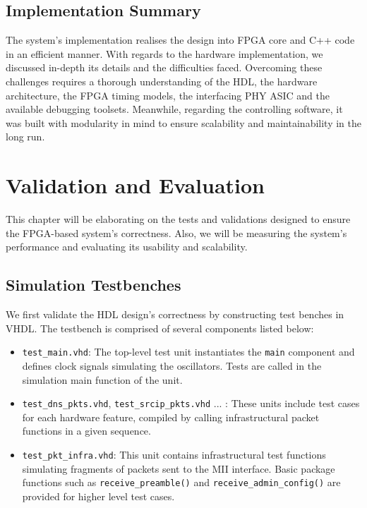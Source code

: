 \documentclass[a4paper]{report}
\newcommand{\proglang}{\textsf}
\newcommand{\code}{\texttt}
\begin{document}
\section{Implementation Summary}

The system's implementation realises the design into FPGA core and \proglang{C++} code in an efficient manner. With regards to the hardware implementation, we discussed in-depth its details and the difficulties faced. Overcoming these challenges requires a thorough understanding of the HDL, the hardware architecture, the FPGA timing models, the interfacing PHY ASIC and the available debugging toolsets. Meanwhile, regarding the controlling software, it was built with modularity in mind to ensure scalability and maintainability in the long run.

\chapter{Validation and Evaluation}

This chapter will be elaborating on the tests and validations designed to ensure the FPGA-based system's correctness. Also, we will be measuring the system's performance and evaluating its usability and scalability. 

\section{Simulation Testbenches}
\label{section:validation-simulation}

We first validate the HDL design's correctness by constructing test benches in \proglang{VHDL}. The testbench is comprised of several components listed below:

\begin{itemize}
    \item \code{test\_main.vhd}: The top-level test unit instantiates the \code{main} component and defines clock signals simulating the oscillators. Tests are called in the simulation main function of the unit.
    \item \code{test\_dns\_pkts.vhd}, \code{test\_srcip\_pkts.vhd} ... : These units include test cases for each hardware feature, compiled by calling infrastructural packet functions in a given sequence. 
    \item \code{test\_pkt\_infra.vhd}: This unit contains infrastructural test functions simulating fragments of packets sent to the MII interface. Basic package functions such as \code{receive\_preamble()} and \code{receive\_admin\_config()} are provided for higher level test cases.
\end{itemize}
\end{document}
